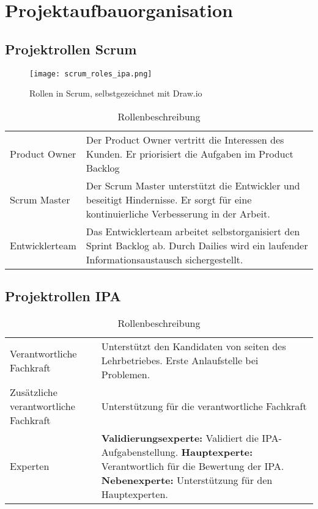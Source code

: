 \chapter{Projektaufbauorganisation}

\section{Projektrollen Scrum}

\begin{figure}[h]
    \centering
    \texttt{[image: scrum\_roles\_ipa.png]}
    \caption{Rollen in Scrum, selbstgezeichnet mit Draw.io}
\end{figure}

\begin{table}[h!]
    \begin{tabular}{|L{0.4\textwidth}|L{0.5\textwidth}|}
        \hline
          \\[12pt]
        \hline
        Product Owner & Der Product Owner vertritt die Interessen des Kunden. Er priorisiert die Aufgaben im Product Backlog  \\
        \hline
        Scrum Master & Der Scrum Master unterstützt die Entwickler und beseitigt Hindernisse. Er sorgt für eine 
        kontinuierliche Verbesserung in der Arbeit. \\
        \hline
        Entwicklerteam & Das Entwicklerteam arbeitet selbstorganisiert den Sprint Backlog ab. 
        Durch Dailies wird ein laufender Informationsaustausch sichergestellt. \\
        \hline
      \end{tabular}
      \caption{Rollenbeschreibung}
\end{table}

\section{Projektrollen IPA}
\begin{table}[h!]
    \begin{tabular}{|L{0.4\textwidth}|L{0.5\textwidth}|}
        \hline
          \\[12pt]
        \hline
        Verantwortliche Fachkraft & Unterstützt den Kandidaten von seiten des Lehrbetriebes. Erste Anlaufstelle bei Problemen.  \\
        \hline
        Zusätzliche verantwortliche Fachkraft & Unterstützung für die verantwortliche Fachkraft \\
        \hline
        Experten & \textbf{Validierungsexperte:} Validiert die IPA-Aufgabenstellung.
                    \textbf{Hauptexperte:} Verantwortlich für die Bewertung der IPA.
                    \textbf{Nebenexperte:} Unterstützung für den Hauptexperten. \\ 
        \hline
      \end{tabular}
      \caption{Rollenbeschreibung}
\end{table}

